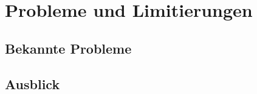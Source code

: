 \chapter{Probleme und Limitierungen} %
\label{Probleme} %

\section{Bekannte Probleme}


\section{Ausblick}

